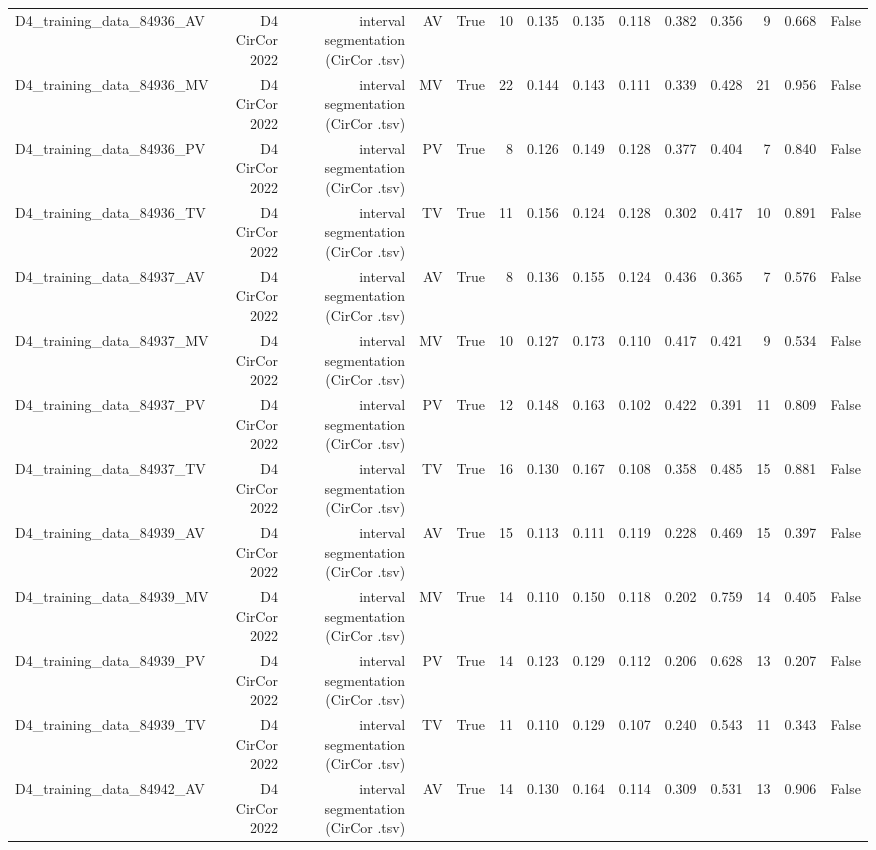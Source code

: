 \begin{table}[htbp]
\begin{tabular}{lrrrrrrrrrrrrr}
    D4\_training\_data\_84936\_AV & D4 CirCor 2022 & interval segmentation (CirCor .tsv) & AV & True & 10 & 0.135 & 0.135 & 0.118 & 0.382 & 0.356 & 9 & 0.668 & False \\
    D4\_training\_data\_84936\_MV & D4 CirCor 2022 & interval segmentation (CirCor .tsv) & MV & True & 22 & 0.144 & 0.143 & 0.111 & 0.339 & 0.428 & 21 & 0.956 & False \\
    D4\_training\_data\_84936\_PV & D4 CirCor 2022 & interval segmentation (CirCor .tsv) & PV & True & 8 & 0.126 & 0.149 & 0.128 & 0.377 & 0.404 & 7 & 0.840 & False \\
    D4\_training\_data\_84936\_TV & D4 CirCor 2022 & interval segmentation (CirCor .tsv) & TV & True & 11 & 0.156 & 0.124 & 0.128 & 0.302 & 0.417 & 10 & 0.891 & False \\
    D4\_training\_data\_84937\_AV & D4 CirCor 2022 & interval segmentation (CirCor .tsv) & AV & True & 8 & 0.136 & 0.155 & 0.124 & 0.436 & 0.365 & 7 & 0.576 & False \\
    D4\_training\_data\_84937\_MV & D4 CirCor 2022 & interval segmentation (CirCor .tsv) & MV & True & 10 & 0.127 & 0.173 & 0.110 & 0.417 & 0.421 & 9 & 0.534 & False \\
    D4\_training\_data\_84937\_PV & D4 CirCor 2022 & interval segmentation (CirCor .tsv) & PV & True & 12 & 0.148 & 0.163 & 0.102 & 0.422 & 0.391 & 11 & 0.809 & False \\
    D4\_training\_data\_84937\_TV & D4 CirCor 2022 & interval segmentation (CirCor .tsv) & TV & True & 16 & 0.130 & 0.167 & 0.108 & 0.358 & 0.485 & 15 & 0.881 & False \\
    D4\_training\_data\_84939\_AV & D4 CirCor 2022 & interval segmentation (CirCor .tsv) & AV & True & 15 & 0.113 & 0.111 & 0.119 & 0.228 & 0.469 & 15 & 0.397 & False \\
    D4\_training\_data\_84939\_MV & D4 CirCor 2022 & interval segmentation (CirCor .tsv) & MV & True & 14 & 0.110 & 0.150 & 0.118 & 0.202 & 0.759 & 14 & 0.405 & False \\
    D4\_training\_data\_84939\_PV & D4 CirCor 2022 & interval segmentation (CirCor .tsv) & PV & True & 14 & 0.123 & 0.129 & 0.112 & 0.206 & 0.628 & 13 & 0.207 & False \\
    D4\_training\_data\_84939\_TV & D4 CirCor 2022 & interval segmentation (CirCor .tsv) & TV & True & 11 & 0.110 & 0.129 & 0.107 & 0.240 & 0.543 & 11 & 0.343 & False \\
    D4\_training\_data\_84942\_AV & D4 CirCor 2022 & interval segmentation (CirCor .tsv) & AV & True & 14 & 0.130 & 0.164 & 0.114 & 0.309 & 0.531 & 13 & 0.906 & False \\

\end{tabular}
\end{table}
